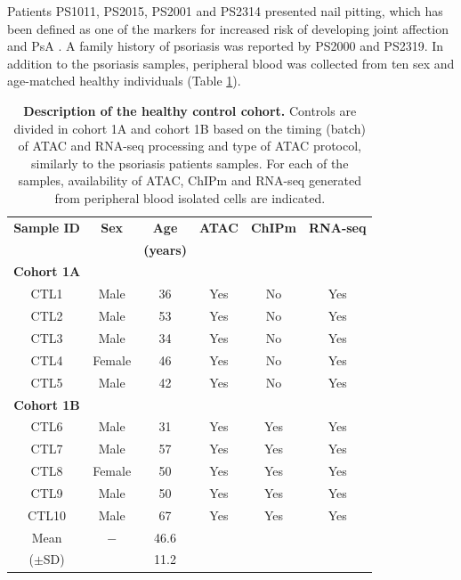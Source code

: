 \noindent Patients PS1011, PS2015, PS2001 and PS2314 presented nail pitting, which has been defined as one of the markers for increased risk of developing joint affection and PsA \parencite{Moll1973,Griffiths2007,McGonagle2011}. A family history of psoriasis was reported by PS2000 and PS2319. In addition to the psoriasis samples, peripheral blood was collected from ten sex and age-matched healthy individuals (Table \ref{tab:Control_cohort_metadata}).



\begin{table}[ht]
\renewcommand{\arraystretch}{0.8}
\centering
\begin{tabular}{@{} c c c c c c}
\toprule
\textbf{Sample ID} & \textbf{Sex} & \textbf{Age}    & \textbf{ATAC} & \textbf{ChIPm} & \textbf{RNA-seq}\\
                   &             & \textbf{(years)} &               &                &                  \\
\midrule
\midrule
\textbf{Cohort 1A} & & & & & \\
\midrule
CTL1 & Male   & 36 & Yes& No& Yes\\
CTL2 & Male   & 53 & Yes& No& Yes\\
CTL3 & Male   & 34 & Yes& No& Yes\\
CTL4 & Female & 46 & Yes& No& Yes\\
CTL5 & Male   & 42 & Yes& No& Yes\\
\midrule
\midrule
\textbf{Cohort 1B} & & & & & \\
\midrule
CTL6  & Male   & 31 & Yes& Yes& Yes\\
CTL7  & Male   & 57 & Yes& Yes& Yes\\
CTL8  & Female & 50 & Yes& Yes& Yes\\
CTL9  & Male   & 50 & Yes& Yes& Yes\\
CTL10 & Male   & 67 & Yes& Yes& Yes\\
\midrule
Mean      & $-$ & 46.6 & & & \\ 
($\pm$SD) &     & 11.2 & & & \\
\bottomrule
\end{tabular}
\medskip %
\caption[Description of the healthy control cohort.]{\textbf{Description of the healthy control cohort.} Controls are divided in cohort 1A and cohort 1B based on the timing (batch) of ATAC and RNA-seq processing and type of ATAC protocol, similarly to the psoriasis patients samples. For each of the samples, availability of ATAC, ChIPm and RNA-seq generated from peripheral blood isolated cells are indicated.}
\label{tab:Control_cohort_metadata}
\end{table}
\bigskip %

